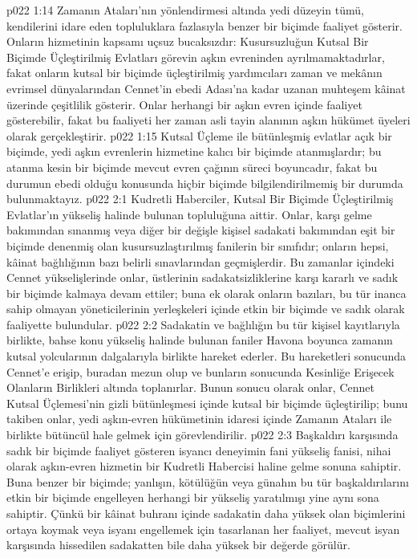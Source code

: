 \vs p022 1:14 Zamanın Ataları’nın yönlendirmesi altında yedi düzeyin tümü, kendilerini idare eden topluluklara fazlasıyla benzer bir biçimde faaliyet gösterir. Onların hizmetinin kapsamı uçsuz bucaksızdır: Kusursuzluğun Kutsal Bir Biçimde Üçleştirilmiş Evlatları görevin aşkın evreninden ayrılmamaktadırlar, fakat onların kutsal bir biçimde üçleştirilmiş yardımcıları zaman ve mekânın evrimsel dünyalarından Cennet’in ebedi Adası’na kadar uzanan muhteşem kâinat üzerinde çeşitlilik gösterir. Onlar herhangi bir aşkın evren içinde faaliyet gösterebilir, fakat bu faaliyeti her zaman asli tayin alanının aşkın hükümet üyeleri olarak gerçekleştirir.
\vs p022 1:15 Kutsal Üçleme ile bütünleşmiş evlatlar açık bir biçimde, yedi aşkın evrenlerin hizmetine kalıcı bir biçimde atanmışlardır; bu atanma kesin bir biçimde mevcut evren çağının süreci boyuncadır, fakat bu durumun ebedi olduğu konusunda hiçbir biçimde bilgilendirilmemiş bir durumda bulunmaktayız.
\vs p022 2:1 Kudretli Haberciler, Kutsal Bir Biçimde Üçleştirilmiş Evlatlar’ın yükseliş halinde bulunan topluluğuna aittir. Onlar, karşı gelme bakımından sınanmış veya diğer bir değişle kişisel sadakati bakımından eşit bir biçimde denenmiş olan kusursuzlaştırılmış fanilerin bir sınıfıdır; onların hepsi, kâinat bağlılığının bazı belirli sınavlarından geçmişlerdir. Bu zamanlar içindeki Cennet yükselişlerinde onlar, üstlerinin sadakatsizliklerine karşı kararlı ve sadık bir biçimde kalmaya devam ettiler; buna ek olarak onların bazıları, bu tür inanca sahip olmayan yöneticilerinin yerleşkeleri içinde etkin bir biçimde ve sadık olarak faaliyette bulundular.
\vs p022 2:2 Sadakatin ve bağlılığın bu tür kişisel kayıtlarıyla birlikte, bahse konu yükseliş halinde bulunan faniler Havona boyunca zamanın kutsal yolcularının dalgalarıyla birlikte hareket ederler. Bu hareketleri sonucunda Cennet’e erişip, buradan mezun olup ve bunların sonucunda Kesinliğe Erişecek Olanların Birlikleri altında toplanırlar. Bunun sonucu olarak onlar, Cennet Kutsal Üçlemesi’nin gizli bütünleşmesi içinde kutsal bir biçimde üçleştirilip; bunu takiben onlar, yedi aşkın\hyp{}evren hükümetinin idaresi içinde Zamanın Ataları ile birlikte bütüncül hale gelmek için görevlendirilir.
\vs p022 2:3 Başkaldırı karşısında sadık bir biçimde faaliyet gösteren isyancı deneyimin fani yükseliş fanisi, nihai olarak aşkın\hyp{}evren hizmetin bir Kudretli Habercisi haline gelme sonuna sahiptir. Buna benzer bir biçimde; yanlışın, kötülüğün veya günahın bu tür başkaldırılarını etkin bir biçimde engelleyen herhangi bir yükseliş yaratılmışı yine aynı sona sahiptir. Çünkü bir kâinat buhranı içinde sadakatin daha yüksek olan biçimlerini ortaya koymak veya isyanı engellemek için tasarlanan her faaliyet, mevcut isyan karşısında hissedilen sadakatten bile daha yüksek bir değerde görülür.
